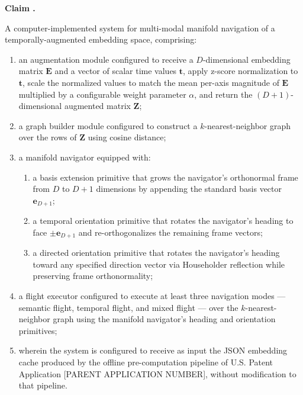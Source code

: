 \documentclass[12pt,letterpaper]{article}
\newcounter{claimcounter}
\newenvironment{claim}{%
  \refstepcounter{claimcounter}%
  \noindent\textbf{Claim \theclaimcounter.}\ %
}{%
  \par\medskip%
}
\newcommand{\parentapp}{U.S. Patent Application [PARENT APPLICATION NUMBER]}
\begin{document}
\begin{claim}
A computer-implemented system for multi-modal manifold navigation of a
temporally-augmented embedding space, comprising:

\begin{enumerate}[label=(\alph*), noitemsep]
  \item an augmentation module configured to receive a $D$-dimensional
    embedding matrix $\mathbf{E}$ and a vector of scalar time values
    $\mathbf{t}$, apply z-score normalization to $\mathbf{t}$, scale the
    normalized values to match the mean per-axis magnitude of $\mathbf{E}$
    multiplied by a configurable weight parameter $\alpha$, and return the
    $(D+1)$-dimensional augmented matrix $\mathbf{Z}$;

  \item a graph builder module configured to construct a $k$-nearest-neighbor
    graph over the rows of $\mathbf{Z}$ using cosine distance;

  \item a manifold navigator equipped with:
    \begin{enumerate}[label=(\roman*), noitemsep]
      \item a basis extension primitive that grows the navigator's orthonormal
        frame from $D$ to $D+1$ dimensions by appending the standard basis
        vector $\mathbf{e}_{D+1}$;
      \item a temporal orientation primitive that rotates the navigator's
        heading to face $\pm\mathbf{e}_{D+1}$ and re-orthogonalizes the
        remaining frame vectors;
      \item a directed orientation primitive that rotates the navigator's
        heading toward any specified direction vector via Householder
        reflection while preserving frame orthonormality;
    \end{enumerate}

  \item a flight executor configured to execute at least three navigation
    modes --- semantic flight, temporal flight, and mixed flight --- over the
    $k$-nearest-neighbor graph using the manifold navigator's heading and
    orientation primitives;

  \item wherein the system is configured to receive as input the JSON
    embedding cache produced by the offline pre-computation pipeline of
    \parentapp, without modification to that pipeline.
\end{enumerate}
\end{claim}
\end{document}
